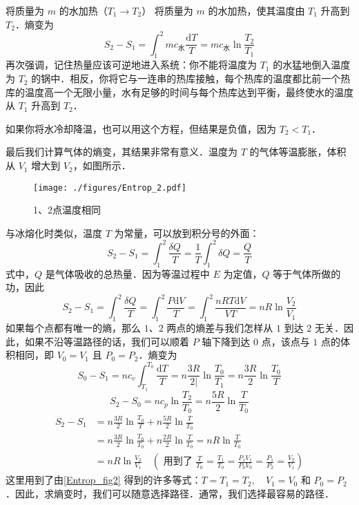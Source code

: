 \begin{example}{将质量为 $m $ 的水加热（$T_1\to T_2$）}
将质量为 $m$ 的水加热，使其温度由 $T_1$ 升高到 $T_2$．熵变为
\begin{equation}
S_2-S_1=\int_1^2{mc_{\text{水}}\frac{\text{d}T}{T}}=mc_{\text{水}}\ln \frac{T_2}{T_1}
\end{equation}
再次强调，记住热量应该可逆地进入系统：你不能将温度为 $T_1$ 的水猛地倒入温度为 $T_2$ 的锅中．相反，你将它与一连串的热库接触，每个热库的温度都比前一个热库的温度高一个无限小量，水有足够的时间与每个热库达到平衡，最终使水的温度从 $T_1$ 升高到 $T_2$．

如果你将水冷却降温，也可以用这个方程，但结果是负值，因为 $T_2<T_1$．

最后我们计算气体的熵变，其结果非常有意义．温度为 $T $ 的气体等温膨胀，体积从 $V_1$ 增大到 $V_2$，如图所示．
\begin{figure}[ht]
\centering
\texttt{[image: ./figures/Entrop\_2.pdf]}
\caption{1、2点温度相同} \label{Entrop_fig2}
\end{figure}
\end{example}
与冰熔化时类似，温度 $T $ 为常量，可以放到积分号的外面：
\begin{equation}
S_2-S_1=\int_1^2{\frac{\delta Q}{T}}=\frac{1}{T}\int_1^2{\delta Q=\frac{Q}{T}}
\end{equation}
式中，$ Q $ 是气体吸收的总热量．因为等温过程中 $E$ 为定值，$Q$ 等于气体所做的功，因此
\begin{equation}
S_2-S_1=\int_1^2{\frac{\delta Q}{T}}=\int_1^2{\frac{P\text{d}V}{T}}=\int_1^2{\frac{nRT\text{d}V}{VT}=nR\ln \frac{V_2}{V_1}}
\end{equation}
如果每个点都有唯一的熵，那么 $1$、$2$ 两点的熵差与我们怎样从 $1$ 到达 $2 $ 无关．因此，如果不沿等温路径的话，我们可以顺着 $P $ 轴下降到达 $0 $ 点，该点与 $1 $ 点的体积相同，即 $V_0=V_1$ 且 $P_0=P_2$．熵变为
\begin{equation}
S_{0}-S_{1}=n c_{v} \int_{T_{1}}^{T_{0}} \frac{\mathrm{d} T}{T}=n \frac{3 R}{2 |} \ln \frac{T_{0}}{T_{1}}=n \frac{3 R}{2} \ln \frac{T_{0}}{T}
\end{equation}
\begin{equation}
S_{2}-S_{0}=n c_{p} \ln \frac{T_{2}}{T_{0}}=n \frac{5 R}{2} \ln \frac{T}{T_{0}}
\end{equation}
\begin{equation}
\begin{aligned} S_{2}-S_{1} &=n \frac{3 R}{2} \ln \frac{T_{0}}{T}+n \frac{5 R}{2} \ln \frac{T}{T_{0}} \\ &=n \frac{3 R}{2} \ln \frac{T_{0}}{T_{0}}+n \frac{2 R}{2} \ln \frac{T}{T_{0}}=n R \ln \frac{T}{T_{0}} \\ &=n R \ln \frac{V_{2}}{V_{1}} \quad\left(\text { 用到了 } \frac{T}{T_{0}}=\frac{T_{1}}{T_{0}}=\frac{P_{1} V_{1}}{P_{0} V_{0}}=\frac{P_{1}}{P_{2}}=\frac{V_{2}}{V_{1}}\right) \end{aligned}
\end{equation}
这里用到了由\autoref{Entrop_fig2} 得到的许多等式：$T=T_{1}=T_{2}, \quad V_{1}=V_{0} \text { 和 } P_{0}=P_{2}$．因此，求熵变时，我们可以随意选择路径．通常，我们选择最容易的路径．

